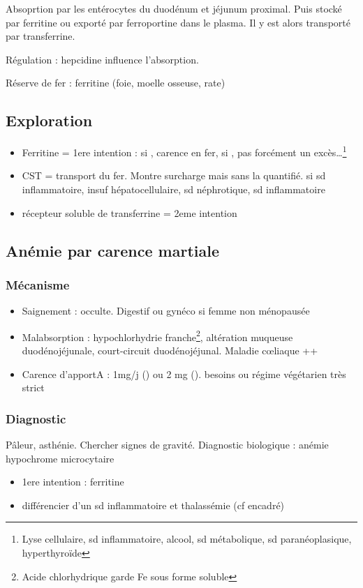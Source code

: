 \documentclass[11pt]{article}
\begin{document}
Absoprtion par les entérocytes du duodénum et jéjunum proximal. Puis stocké par
ferritine ou exporté par ferroportine dans le plasma. Il y est alors transporté
par transferrine.

Régulation : hepcidine influence l'absorption.

Réserve de fer : ferritine (foie, moelle osseuse, rate)

\subsection{Exploration}
\label{sec:org1d493ed}
\begin{itemize}
\item Ferritine = 1ere intention : si \dec, carence en fer, si \inc, pas forcément
un excès\ldots{}\footnote{Lyse cellulaire, sd inflammatoire, alcool, sd métabolique, sd
paranéoplasique, hyperthyroïde}
\item \gls{CST} = transport du fer. Montre surcharge mais sans la quantifié. \dec si
sd inflammatoire, \inc insuf hépatocellulaire, sd néphrotique, sd
inflammatoire
\item récepteur soluble de transferrine = 2eme intention
\end{itemize}

\subsection{Anémie par carence martiale}
\label{sec:org6fac169}
\subsubsection{Mécanisme}
\label{sec:org25cf649}
\begin{itemize}
\item Saignement : occulte. Digestif ou gynéco si femme non ménopausée
\item Malabsorption : hypochlorhydrie franche\footnote{Acide chlorhydrique garde Fe sous forme soluble}, altération muqueuse
duodénojéjunale, court-circuit duodénojéjunal. Maladie c\oe{}liaque ++
\item Carence d'apportA : 1mg/j (\male) ou 2 mg (\female). \inc besoins ou régime
végétarien très strict
\end{itemize}
\subsubsection{Diagnostic}
\label{sec:org8ad765b}
Pâleur, asthénie. Chercher signes de gravité.
Diagnostic biologique : anémie hypochrome microcytaire 
\begin{itemize}
\item 1ere intention : ferritine \inc
\item différencier d'un sd inflammatoire et thalassémie (cf encadré)
\end{itemize}
\end{document}
